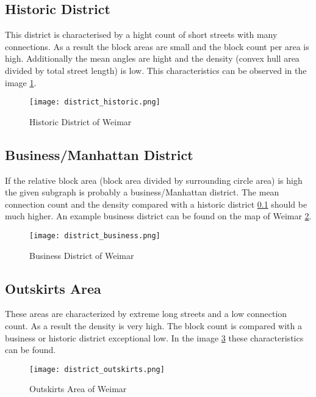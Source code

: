 \subsection{Historic District}
\label{sec:historyDistinct}
This district is characterised by a hight count of short streets with many connections. As a result the block areas are small and the block count per area is high. Additionally the mean angles are hight and the density (convex hull area divided by total street length) is low. This characteristics can be observed in the image \ref{fig:historic_district}.

\begin{figure}[!ht]
    \centering
    \begin{mdframed}[style=mdthight, userdefinedwidth=0.4\textwidth, align=center]
        \texttt{[image: district\_historic.png]}
    \end{mdframed}
    \caption{Historic District of Weimar}
    \label{fig:historic_district}
\end{figure}

\FloatBarrier
\subsection{Business/Manhattan District} 
\label{sec:businessDistinct}
If the relative block area (block area divided by surrounding circle area) is high the given subgraph is probably a business/Manhattan district. The mean connection count and the density compared with a historic district \ref{sec:historyDistinct} should be much higher. An example business district can be found on the map of Weimar \ref{fig:business_district}.

\begin{figure}[!ht]
    \centering
    \begin{mdframed}[style=mdthight, userdefinedwidth=0.4\textwidth, align=center]
        \texttt{[image: district\_business.png]}
    \end{mdframed}
    \caption{Business District of Weimar}
    \label{fig:business_district}
\end{figure}

\FloatBarrier
\subsection{Outskirts Area}
\label{sec:outskits}
These areas are characterized by extreme long streets and a low connection count. As a result the density is very high. The block count is compared with a business or historic district exceptional low. In the image \ref{fig:outskirts_district} these characteristics can be found.

\begin{figure}[!ht]
    \centering
    \begin{mdframed}[style=mdthight, userdefinedwidth=0.4\textwidth, align=center]
        \texttt{[image: district\_outskirts.png]}
    \end{mdframed}
    \caption{Outskirts Area of Weimar}
    \label{fig:outskirts_district}
\end{figure}